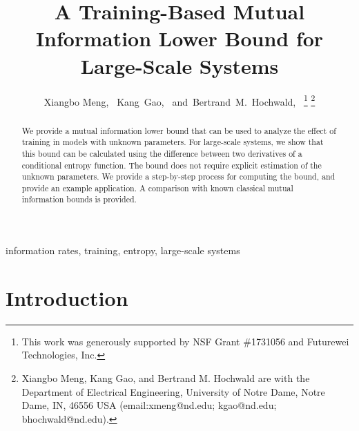 \documentclass[12pt, draftclsnofoot,journal,onecolumn]{IEEEtran}
\begin{document}
\title{A Training-Based Mutual Information Lower Bound for Large-Scale Systems}
\author{Xiangbo Meng,~ Kang~Gao,~ and~Bertrand~M.~Hochwald,~%
\thanks{This work was generously supported by NSF Grant \#1731056 and Futurewei Technologies, Inc.}
\thanks{Xiangbo Meng, Kang Gao, and Bertrand M. Hochwald are with the Department of Electrical Engineering, University of Notre Dame, Notre Dame, IN, 46556 USA (email:xmeng@nd.edu; kgao@nd.edu; bhochwald@nd.edu).}}
\maketitle
\thispagestyle{plain}
\pagestyle{plain}
\begin{abstract}
We provide a mutual information lower bound that can be used to analyze the effect of training in models with unknown parameters. For large-scale systems, we show that this bound can be calculated using the difference between two derivatives of a conditional entropy function.  The bound does not require explicit estimation of the unknown parameters.  We provide a step-by-step process for computing the bound, and provide an example application.  A comparison with known classical mutual information bounds is provided.
\end{abstract}
\begin{IEEEkeywords}
information rates, training, entropy, large-scale systems
\end{IEEEkeywords}
\IEEEpeerreviewmaketitle

\section{Introduction}

\end{document}
